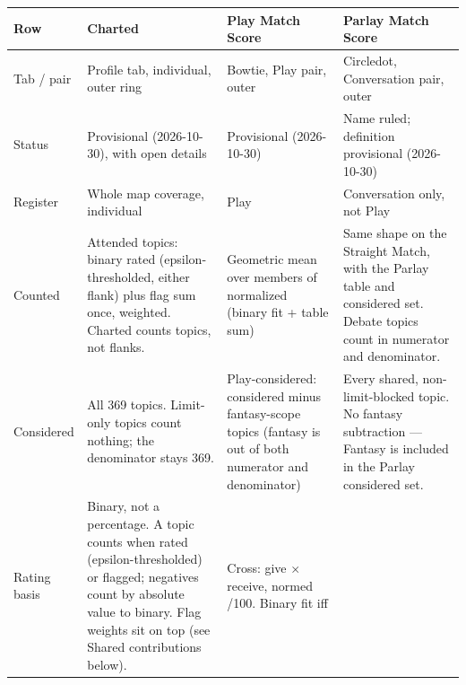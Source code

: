{\def\LTcaptype{none} %
\begin{longtable}[]{@{}
  >{\raggedright\arraybackslash}p{}
  >{\raggedright\arraybackslash}p{}
  >{\raggedright\arraybackslash}p{}
  >{\raggedright\arraybackslash}p{}@{}}
\toprule\noalign{}
\begin{minipage}[b]{\linewidth}\raggedright
Row
\end{minipage} & \begin{minipage}[b]{\linewidth}\raggedright
Charted
\end{minipage} & \begin{minipage}[b]{\linewidth}\raggedright
Play Match Score
\end{minipage} & \begin{minipage}[b]{\linewidth}\raggedright
Parlay Match Score
\end{minipage} \\
\midrule\noalign{}
\endhead
\bottomrule\noalign{}
\endlastfoot
Tab / pair & Profile tab, individual, outer ring & Bowtie, Play pair,
outer & Circledot, Conversation pair, outer \\
Status & Provisional (2026-10-30), with open details & Provisional
(2026-10-30) & Name ruled; definition provisional (2026-10-30) \\
Register & Whole map coverage, individual & Play & Conversation only,
not Play \\
Counted & Attended topics: binary rated (epsilon-thresholded, either
flank) plus flag sum once, weighted. Charted counts topics, not flanks.
& Geometric mean over members of normalized (binary fit + table sum) &
Same shape on the Straight Match, with the Parlay table and considered
set. Debate topics count in numerator and denominator. \\
Considered & All 369 topics. Limit-only topics count nothing; the
denominator stays 369. & Play-considered: considered minus fantasy-scope
topics (fantasy is out of both numerator and denominator) & Every
shared, non-limit-blocked topic. No fantasy subtraction --- Fantasy is
included in the Parlay considered set. \\
Rating basis & Binary, not a percentage. A topic counts when rated
(epsilon-thresholded) or flagged; negatives count by absolute value to
binary. Flag weights sit on top (see Shared contributions below). &
Cross: give $\times$ receive, normed /100. Binary fit iff

\end{longtable}}
